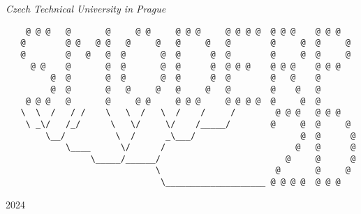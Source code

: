 \begin{titlepage}
	\vspace{0.5\baselineskip} %
	
	\textit{Czech Technical University  in Prague} %
	
	\vfill %
	
	
	
	
	\begin{verbatim}
    @ @ @   @       @     @ @     @ @ @     @ @ @ @  @ @ @    @ @ @
   @        @ @   @ @   @     @   @     @   @        @     @  @     @
   @        @   @   @  @       @  @      @  @        @     @  @     @
     @ @    @       @  @       @  @      @  @ @ @    @ @ @    @ @ @
         @  @       @  @       @  @      @  @        @   @    @
         @  @       @   @     @   @     @   @        @    @   @
    @ @ @   @       @     @ @     @ @ @     @ @ @ @  @     @  @
   \  \  /   / /    \   \  /   \  /    /     /        @ @ @   @ @ @
    \ _\/   /_/      \   \/     \/    /_____/        @     @  @     @
        \__/          \  /      _\___/                     @  @      @
            \____      \/      /                          @   @      @
                 \_____/______/                         @     @      @
                              \                       @       @     @
                               \____________________ @ @ @ @  @ @ @
 \end{verbatim}
 
 
 
        
	
	\vspace{0.3\baselineskip} %
	
    \begin{center}
	2024 %
	
    \end{center}

\end{titlepage}



